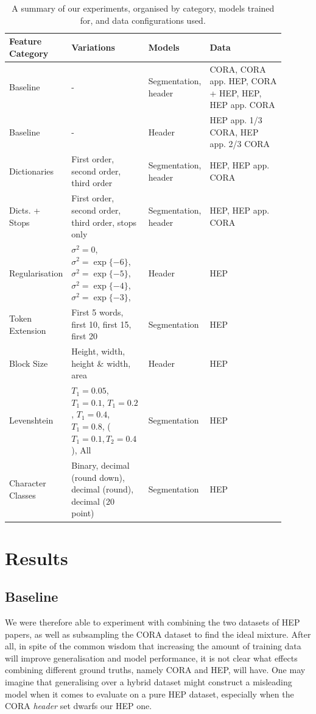 \begin{table}[h]
\begin{center}
\begin{tabular}{ | p{0.2\linewidth} | p{0.25\linewidth} | p{0.15\linewidth} | p{0.3\linewidth} |}
\hline
Feature Category & Variations & Models & Data\\
\hline
Baseline & - & Segmentation, header & CORA, CORA app. HEP, CORA + HEP, HEP, HEP app. CORA \\
\hline
Baseline & - & Header & HEP app. 1/3 CORA, HEP app. 2/3 CORA \\
\hline
Dictionaries & First order, second order, third order & Segmentation, header & HEP, HEP app. CORA \\
\hline
Dicts. + Stops & First order, second order, third order, stops only & Segmentation, header & HEP, HEP app. CORA \\
\hline
Regularisation & $\sigma^2=0$, $\sigma^2=\exp\{-6\}$, $\sigma^2=\exp\{-5\}$, $\sigma^2=\exp\{-4\}$, $\sigma^2=\exp\{-3\}$, & Header & HEP \\
\hline
Token Extension & First 5 words, first 10, first 15, first 20 & Segmentation & HEP \\
\hline
Block Size & Height, width, height \& width, area & Header & HEP \\
\hline
Levenshtein & $T_1 = 0.05$, $T_1 = 0.1$, $T_1 = 0.2$, $T_1 = 0.4$, $T_1 = 0.8$, ($T_1 = 0.1, T_2 = 0.4$), All & Segmentation & HEP \\
\hline
Character Classes & Binary, decimal (round down), decimal (round), decimal (20 point) & Segmentation & HEP \\
\hline
\end{tabular}
\caption[A summary of our experiments, organised by category, models trained for, and data configurations used.]{A summary of our experiments, organised by category, models trained for, and data configurations used.}
\label{table:experiments}
\end{center}
\end{table}

\section{Results}
\label{sec:results}
\subsection{Baseline}

We were therefore able to experiment with combining the two datasets of HEP papers, as well as subsampling the CORA dataset to find the ideal mixture. After all, in spite of the common wisdom that increasing the amount of training data will improve generalisation and model performance, it is not clear what effects combining different ground truths, namely CORA and HEP, will have. One may imagine that generalising over a hybrid dataset might construct a misleading model when it comes to evaluate on a pure HEP dataset, especially when the CORA \emph{header} set dwarfs our HEP one.

